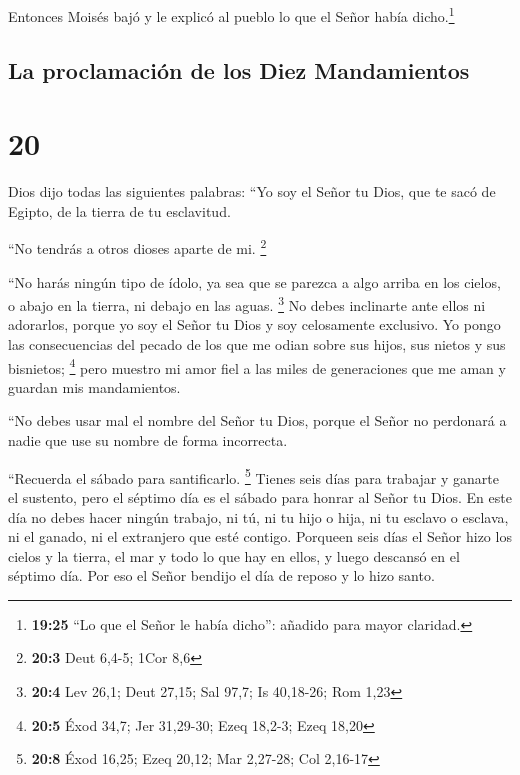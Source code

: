  Entonces Moisés bajó y le explicó al pueblo lo que el
Señor había dicho.\footnote{\textbf{19:25} ``Lo que el Señor le había
  dicho'': añadido para mayor claridad.}

\hypertarget{la-proclamaciuxf3n-de-los-diez-mandamientos}{%
\subsection{La proclamación de los Diez
Mandamientos}\label{la-proclamaciuxf3n-de-los-diez-mandamientos}}

\hypertarget{section-19}{%
\section{20}\label{section-19}}

 Dios dijo todas las siguientes palabras: 
``Yo soy el Señor tu Dios, que te sacó de Egipto, de la tierra de tu
esclavitud.

 ``No tendrás a otros dioses aparte de mi. \footnote{\textbf{20:3}
  Deut 6,4-5; 1Cor 8,6}

 ``No harás ningún tipo de ídolo, ya sea que se parezca a
algo arriba en los cielos, o abajo en la tierra, ni debajo en las aguas.
\footnote{\textbf{20:4} Lev 26,1; Deut 27,15; Sal 97,7; Is 40,18-26; Rom
  1,23}  No debes inclinarte ante ellos ni adorarlos,
porque yo soy el Señor tu Dios y soy celosamente exclusivo. Yo pongo las
consecuencias del pecado de los que me odian sobre sus hijos, sus nietos
y sus bisnietos; \footnote{\textbf{20:5} Éxod 34,7; Jer 31,29-30; Ezeq
  18,2-3; Ezeq 18,20}  pero muestro mi amor fiel a las
miles de generaciones que me aman y guardan mis mandamientos.

 ``No debes usar mal el nombre del Señor tu Dios, porque
el Señor no perdonará a nadie que use su nombre de forma incorrecta.

 ``Recuerda el sábado para santificarlo. \footnote{\textbf{20:8}
  Éxod 16,25; Ezeq 20,12; Mar 2,27-28; Col 2,16-17} 
Tienes seis días para trabajar y ganarte el sustento, 
pero el séptimo día es el sábado para honrar al Señor tu Dios. En este
día no debes hacer ningún trabajo, ni tú, ni tu hijo o hija, ni tu
esclavo o esclava, ni el ganado, ni el extranjero que esté contigo.
 Porqueen seis días el Señor hizo los cielos y la tierra,
el mar y todo lo que hay en ellos, y luego descansó en el séptimo día.
Por eso el Señor bendijo el día de reposo y lo hizo santo.

